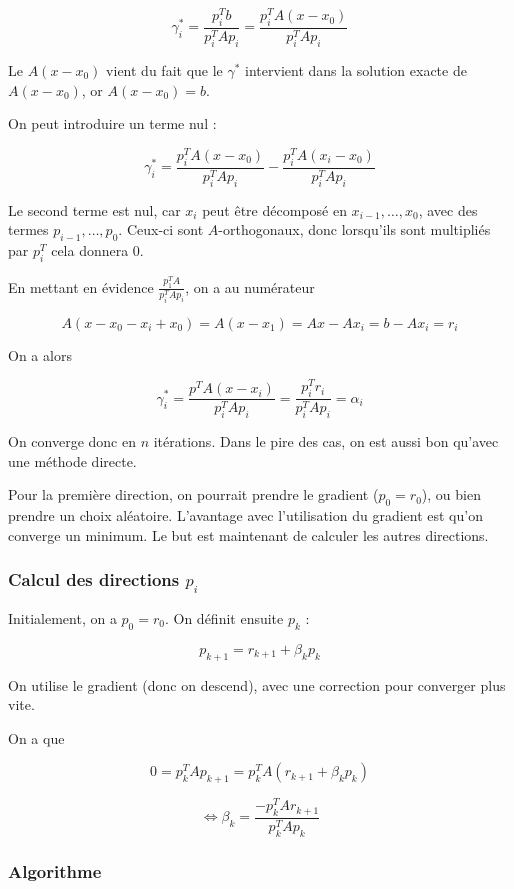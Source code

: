 		$$\gamma_i^* = \frac{p_i^Tb}{p_i^TAp_i} =  \frac{p_i^TA(x - x_0)}{p_i^TAp_i}$$
		
		Le $A(x - x_0)$ vient du fait que le $\gamma^*$ intervient dans la solution exacte de $A(x - x_0)$, or $A(x - x_0) = b$.
		
		On peut introduire un terme nul :
		
		$$\gamma_i^* = \frac{p_i^TA(x - x_0)}{p_i^TAp_i} - \frac{p_i^TA(x_i - x_0)}{p_i^TAp_i}$$
		
		Le second terme est nul, car $x_i$ peut être décomposé en $x_{i - 1}, \dots , x_0$, avec des termes $p_{i - 1}, \dots , p_0$. Ceux-ci sont $A$-orthogonaux, donc lorsqu'ils sont multipliés par $p_i^T$ cela donnera 0.
		
		En mettant en évidence $\frac{p_1^TA}{p_i^TAp_i}$, on a au numérateur
		
		$$A(x - x_0 - x_i + x_0) = A(x - x_1) = Ax - Ax_i = b - Ax_i = r_i$$
		
		On a alors
		
		$$\gamma_i^* = \frac{p^TA(x - x_i)}{p_i^TAp_i} = \frac{p_i^Tr_i}{p_i^TAp_i} = \alpha_i$$
		
		On converge donc en $n$ itérations. Dans le pire des cas, on est aussi bon qu'avec une méthode directe.
		
		Pour la première direction, on pourrait prendre le gradient ($p_0 = r_0$), ou bien prendre un choix aléatoire. L'avantage avec l'utilisation du gradient est qu'on converge un minimum. Le but est maintenant de calculer les autres directions.
		
		\subsubsection{Calcul des directions $p_i$}
		
		Initialement, on a $p_0 = r_0$. On définit ensuite $p_k$ :
		
		$$p_{k + 1} = r_{k + 1} + \beta_k p_k$$
		
		On utilise le gradient (donc on descend), avec une correction pour converger plus vite.
		
		On a que
		
		$$0 = p_k^TAp_{k + 1} = p_k^TA(r_{k + 1} + \beta_kp_k)$$
		
		$$\Leftrightarrow \beta_k = \frac{-p_k^TAr_{k + 1}}{p_k^TAp_k}$$
		
		\subsubsection{Algorithme}

